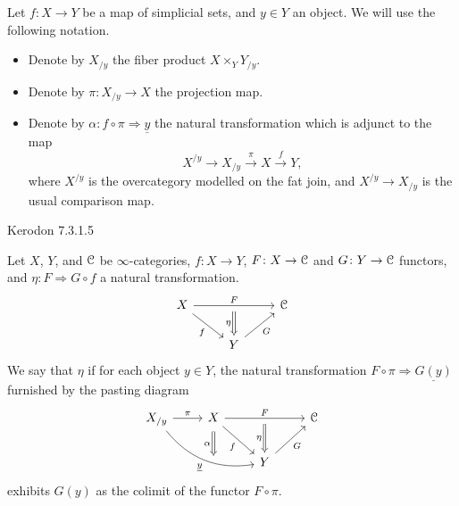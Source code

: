 \documentclass[main.tex]{subfiles}
\begin{document}
\begin{notation}
  Let $f\colon X \to Y$ be a map of simplicial sets, and $y \in Y$ an object. We will use the following notation.
  \begin{itemize}
    \item Denote by $X_{/y}$ the fiber product $X \times_{Y} Y_{/y}$. 

    \item Denote by $\pi\colon X_{/y} \to X$ the projection map.

    \item Denote by $\alpha\colon f \circ \pi \Rightarrow \underline{y}$ the natural transformation which is adjunct to the map
      \begin{equation*}
        X^{/y} \to X_{/y} \overset{\pi}{\to} X \overset{f}{\to} Y,
      \end{equation*}
      where $X^{/y}$ is the overcategory modelled on the fat join, and $X^{/y} \to X_{/y}$ is the usual comparison map.
  \end{itemize}
\end{notation}

Kerodon 7.3.1.5
\begin{definition}
  \label{def:nat_xfo_exhibiting_left_kan_ext}
  Let $X$, $Y$, and $\mathcal{C}$ be $\infty$-categories, $f\colon X \to Y$, $F\colon X \to \mathcal{C}$ and $G\colon Y \to \mathcal{C}$ functors, and $\eta\colon F \Rightarrow G \circ f$ a natural transformation.
  \begin{equation*}
    \begin{tikzcd}
      X
      \arrow[dr, swap, "f"]
      \arrow[rr, "F", ""{below, name=M}]
      && \category{C}
      \\
      & Y
      \arrow[ur, swap, "G"]
      \arrow[from=M, Rightarrow, swap, "\eta"]
    \end{tikzcd}
  \end{equation*}
  We say that $\eta$  if for each object $y \in Y$, the natural transformation $F \circ \pi \Rightarrow \underline{G(y)}$ furnished by the pasting diagram
  \begin{equation*}
    \begin{tikzcd}
      X_{/y}
      \arrow[r, "\pi", ""{name=LU, swap}]
      \arrow[drr, bend right, "\underline{y}"{swap}, ""{name=LD}]
      & X
      \arrow[dr, swap, "f"]
      \arrow[rr, "F", ""{below, name=M}]
      \arrow[d, Rightarrow, shorten=1ex, swap, "\alpha"]
      && \category{C}
      \\
      & \ 
      & Y
      \arrow[ur, swap, "G"]
      \arrow[from=M, Rightarrow, swap, "\eta"]
    \end{tikzcd}
  \end{equation*}
  exhibits $G(y)$ as the colimit of the functor $F \circ \pi$.
\end{definition}
\end{document}
